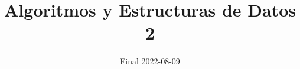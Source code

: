 

\renewcommand{\theenumi}{\alph{enumi}}

\title{Algoritmos y Estructuras de Datos 2}
\author{Final 2022-08-09}
\date{}



\maketitle







